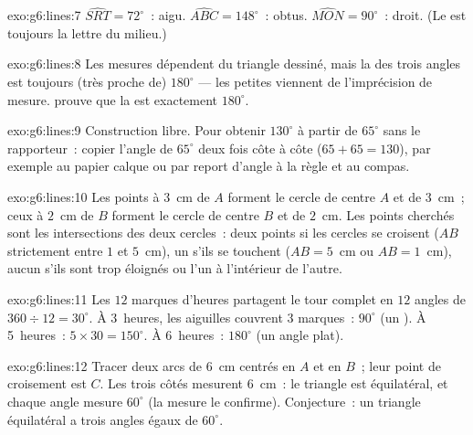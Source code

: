 \begin{solution}{exo:g6:lines:7}
$\widehat{SRT} = 72^\circ$~: aigu. \quad
$\widehat{ABC} = 148^\circ$~: obtus. \quad
$\widehat{MON} = 90^\circ$~: droit. (Le  est toujours la lettre
du milieu.)
\end{solution}

\begin{solution}{exo:g6:lines:8}
Les mesures dépendent du triangle dessiné, mais la  des trois
angles est toujours (très proche de) $180^\circ$ --- les petites
 viennent de l'imprécision de mesure. 
prouve que la  est exactement $180^\circ$.
\end{solution}

\begin{solution}{exo:g6:lines:9}
Construction libre. Pour obtenir $130^\circ$ à partir de $65^\circ$
sans le rapporteur~: copier l'angle de $65^\circ$ deux fois côte à
côte ($65 + 65 = 130$), par exemple au papier calque ou par report
d'angle à la règle et au compas.
\end{solution}

\begin{solution}{exo:g6:lines:10}
Les points à $3$~cm de $A$ forment le cercle de centre $A$ et de
 $3$~cm~; ceux à $2$~cm de $B$ forment le cercle de centre $B$
et de  $2$~cm. Les points cherchés sont les intersections des
deux cercles~: deux points si les cercles se croisent ($AB$
strictement entre $1$ et $5$~cm), un s'ils se touchent ($AB = 5$~cm ou
$AB = 1$~cm), aucun s'ils sont trop éloignés ou l'un à l'intérieur de
l'autre.
\end{solution}

\begin{solution}{exo:g6:lines:11}
Les $12$ marques d'heures partagent le tour complet en $12$ angles de
$360 \div 12 = 30^\circ$. À 3~heures, les aiguilles couvrent $3$
marques~: $90^\circ$ (un ). À 5~heures~:
$5 \times 30 = 150^\circ$. À 6~heures~: $180^\circ$ (un angle plat).
\end{solution}

\begin{solution}{exo:g6:lines:12}
Tracer deux arcs de  $6$~cm centrés en $A$ et en $B$~; leur
point de croisement est $C$. Les trois côtés mesurent $6$~cm~: le
triangle est équilatéral, et chaque angle mesure $60^\circ$ (la mesure
le confirme). Conjecture~: un triangle équilatéral a trois angles égaux
de $60^\circ$.
\end{solution}

